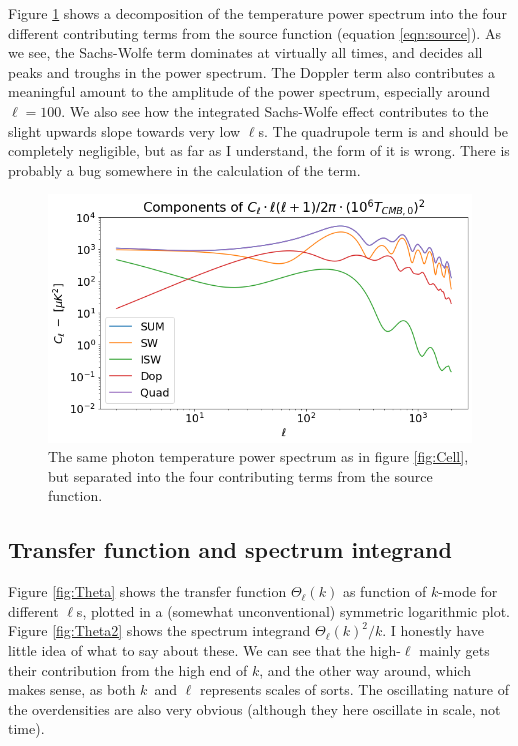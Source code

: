 \documentclass[10pt, a4paper]{article}
\begin{document}
Figure \ref{fig:Cell_all} shows a decomposition of the temperature power spectrum into the four different contributing terms from the source function (equation \ref{eqn:source}). As we see, the Sachs-Wolfe term dominates at virtually all times, and decides all peaks and troughs in the power spectrum. The Doppler term also contributes a meaningful amount to the amplitude of the power spectrum, especially around $\ell=100$. We also see how the integrated Sachs-Wolfe effect contributes to the slight upwards slope towards very low $\ell$s. The quadrupole term is and should be completely negligible, but as far as I understand, the form of it is wrong. There is probably a bug somewhere in the calculation of the term.

\begin{figure}[H]
    \centering
    \includegraphics[scale=0.5]{../m4_figs/Cell_all.png}
    \caption{The same photon temperature power spectrum as in figure \ref{fig:Cell}, but separated into the four contributing terms from the source function.}
    \label{fig:Cell_all}
\end{figure}


\subsection{Transfer function and spectrum integrand}
Figure \ref{fig:Theta} shows the transfer function $\Theta_\ell(k)$ as function of $k$-mode for different $\ell$s, plotted in a (somewhat unconventional) symmetric logarithmic plot. Figure \ref{fig:Theta2} shows the spectrum integrand $\Theta_\ell(k)^2/k$. I honestly have little idea of what to say about these. We can see that the high-$\ell$ mainly gets their contribution from the high end of $k$, and the other way around, which makes sense, as both $k$ and $\ell$ represents scales of sorts. The oscillating nature of the overdensities are also very obvious (although they here oscillate in scale, not time).
\end{document}
